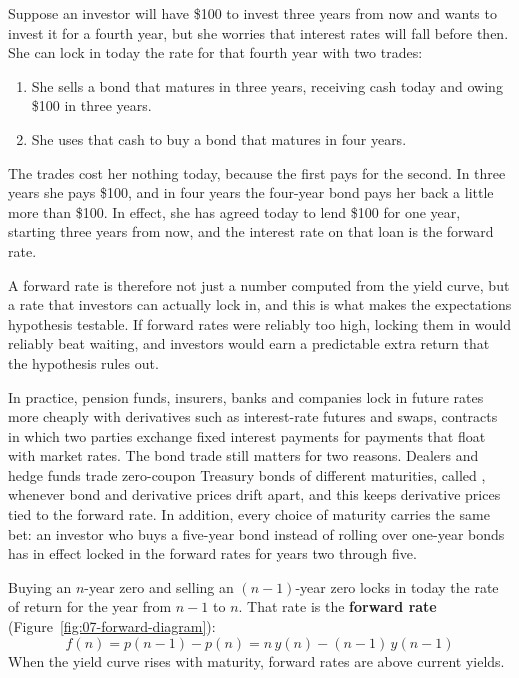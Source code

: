 Suppose an investor will have \$100 to invest three years from now and wants to invest it for a fourth year, but she worries that interest rates will fall before then. She can lock in today the rate for that fourth year with two trades:
\begin{enumerate}
  \item She sells a bond that matures in three years, receiving cash today and owing \$100 in three years.
  \item She uses that cash to buy a bond that matures in four years.
\end{enumerate}
The trades cost her nothing today, because the first pays for the second. In three years she pays \$100, and in four years the four-year bond pays her back a little more than \$100. In effect, she has agreed today to lend \$100 for one year, starting three years from now, and the interest rate on that loan is the forward rate.

A forward rate is therefore not just a number computed from the yield curve, but a rate that investors can actually lock in, and this is what makes the expectations hypothesis testable. If forward rates were reliably too high, locking them in would reliably beat waiting, and investors would earn a predictable extra return that the hypothesis rules out.

In practice, pension funds, insurers, banks and companies lock in future rates more cheaply with derivatives such as interest-rate futures and swaps, contracts in which two parties exchange fixed interest payments for payments that float with market rates. The bond trade still matters for two reasons. Dealers and hedge funds trade zero-coupon Treasury bonds of different maturities, called , whenever bond and derivative prices drift apart, and this keeps derivative prices tied to the forward rate. In addition, every choice of maturity carries the same bet: an investor who buys a five-year bond instead of rolling over one-year bonds has in effect locked in the forward rates for years two through five.

Buying an $n$-year zero and selling an $(n-1)$-year zero locks in today the rate of return for the year from $n-1$ to $n$. That rate is the \textbf{forward rate} (Figure~\ref{fig:07-forward-diagram}):
\begin{equation}
  f(n) = p(n-1) - p(n) = n\,y(n) - (n-1)\,y(n-1)
  \label{eq:07-forward}
\end{equation}
When the yield curve rises with maturity, forward rates are above current yields.


